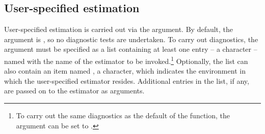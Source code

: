 \subsection{User-specified estimation}

User-specified estimation is carried out via the  argument. By default, the argument is , so no diagnostic tests are undertaken. To carry out diagnostics, the argument must be specified as a list containing at least one entry -- a character -- named  with the name of the estimator to be invoked.\footnote{To carry out the same diagnostics as the default of the  function, the argument can be set to .} Optionally, the list can also contain an item named , a character, which indicates the environment in which the user-specified estimator resides. Additional entries in the list, if any, are passed on to the estimator as arguments.

